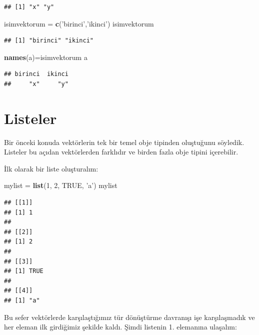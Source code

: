 \documentclass[]{book}
\newenvironment{Shaded}{\begin{snugshade}}{\end{snugshade}}
\newcommand{\DecValTok}[1]{\textcolor[rgb]{0.00,0.00,0.81}{#1}}
\newcommand{\KeywordTok}[1]{\textcolor[rgb]{0.13,0.29,0.53}{\textbf{#1}}}
\newcommand{\NormalTok}[1]{#1}
\newcommand{\OtherTok}[1]{\textcolor[rgb]{0.56,0.35,0.01}{#1}}
\newcommand{\StringTok}[1]{\textcolor[rgb]{0.31,0.60,0.02}{#1}}
\begin{document}
\begin{verbatim}
## [1] "x" "y"
\end{verbatim}

\begin{Shaded}
\begin{Highlighting}[]
\NormalTok{isimvektorum =}\StringTok{ }\KeywordTok{c}\NormalTok{(}\StringTok{'birinci'}\NormalTok{,}\StringTok{'ikinci'}\NormalTok{)}
\NormalTok{isimvektorum}
\end{Highlighting}
\end{Shaded}

\begin{verbatim}
## [1] "birinci" "ikinci"
\end{verbatim}

\begin{Shaded}
\begin{Highlighting}[]
\KeywordTok{names}\NormalTok{(a)=isimvektorum}
\NormalTok{a}
\end{Highlighting}
\end{Shaded}

\begin{verbatim}
## birinci  ikinci 
##     "x"     "y"
\end{verbatim}

\hypertarget{listeler}{%
\chapter{Listeler}\label{listeler}}

Bir önceki konuda vektörlerin tek bir temel obje tipinden oluştuğunu
söyledik. Listeler bu açıdan vektörlerden farklıdır ve birden fazla obje
tipini içerebilir.

İlk olarak bir liste oluşturalım:

\begin{Shaded}
\begin{Highlighting}[]
\NormalTok{mylist =}\StringTok{ }\KeywordTok{list}\NormalTok{(}\DecValTok{1}\NormalTok{, }\DecValTok{2}\NormalTok{, }\OtherTok{TRUE}\NormalTok{, }\StringTok{'a'}\NormalTok{)}
\NormalTok{mylist}
\end{Highlighting}
\end{Shaded}

\begin{verbatim}
## [[1]]
## [1] 1
## 
## [[2]]
## [1] 2
## 
## [[3]]
## [1] TRUE
## 
## [[4]]
## [1] "a"
\end{verbatim}

Bu sefer vektörlerde karşılaştığımız tür dönüştürme davranışı işe
karşılaşmadık ve her eleman ilk girdiğimiz şekilde kaldı. Şimdi listenin
1. elemanına ulaşalım:
\end{document}
